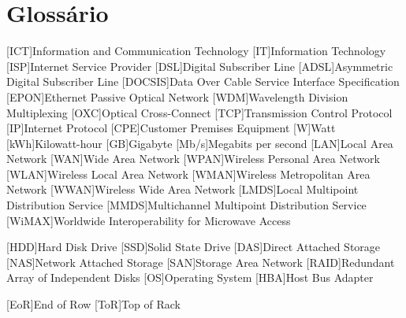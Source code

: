 \chapter{Glossário}

\footnotesize
\SingleSpacing

\begin{multicols}{2}
\begin{acronym}[AAAAAA]

	[ICT]{Information and Communication Technology}
	[IT]{Information Technology}
	[ISP]{Internet Service Provider}
	[DSL]{Digital Subscriber Line}
	[ADSL]{Asymmetric Digital Subscriber Line}
	[DOCSIS]{Data Over Cable Service Interface Specification}
	[EPON]{Ethernet Passive Optical Network}
	[WDM]{Wavelength Division Multiplexing}
	[OXC]{Optical Cross-Connect}
	[TCP]{Transmission Control Protocol}
	[IP]{Internet Protocol}
	[CPE]{Customer Premises Equipment}
	{Watt}
	[kWh]{Kilowatt-hour}
	[GB]{Gigabyte}
	[Mb/s]{Megabits per second}
	[LAN]{Local Area Network}
	[WAN]{Wide Area Network}
	[WPAN]{Wireless Personal Area Network}
	[WLAN]{Wireless Local Area Network}
	[WMAN]{Wireless Metropolitan Area Network}
	[WWAN]{Wireless Wide Area Network}
	[LMDS]{Local Multipoint Distribution Service}
	[MMDS]{Multichannel Multipoint Distribution Service}
	[WiMAX]{Worldwide Interoperability for Microwave Access}

	[HDD]{Hard Disk Drive}
	[SSD]{Solid State Drive}
	[DAS]{Direct Attached Storage}
	[NAS]{Network Attached Storage}
	[SAN]{Storage Area Network}
	[RAID]{Redundant Array of Independent Disks}
	[OS]{Operating System}
	[HBA]{Host Bus Adapter}

	[EoR]{End of Row}
	[ToR]{Top of Rack}


\end{acronym}
\end{multicols}

